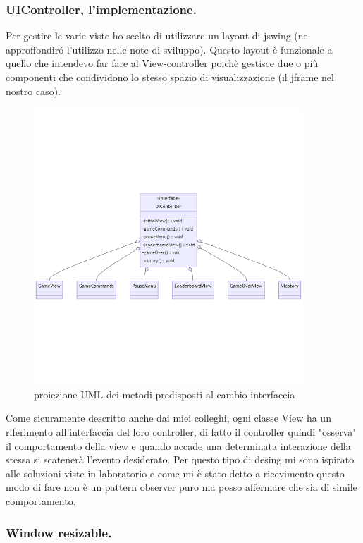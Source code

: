 \documentclass[a4paper,12pt]{report}
\begin{document}
\subsubsection{UIController, l'implementazione.}
Per gestire le varie viste ho scelto di utilizzare un layout di jswing (ne approffondiró l'utilizzo nelle note di sviluppo).
Questo layout è funzionale a quello che intendevo far fare al View-controller poichè
gestisce due o più componenti che condividono lo stesso spazio di visualizzazione (il jframe nel nostro caso).

\begin{figure}[H]
    \centering
    \includegraphics[width=0.9\textwidth]{images/UIControllerIMpl.png}
    \caption{proiezione UML dei metodi predisposti al cambio interfaccia}
\end{figure}

Come sicuramente descritto anche dai miei colleghi, ogni classe View ha un riferimento all'interfaccia
del loro controller, di fatto il controller quindi "osserva" il comportamento della view e quando accade una
determinata interazione della stessa si scatenerà l'evento desiderato.
Per questo tipo di desing mi sono ispirato alle soluzioni viste in laboratorio e come mi è stato detto
a ricevimento questo modo di fare non è un pattern observer puro ma posso affermare che sia di simile
comportamento.

\subsubsection{Window resizable.}
\end{document}
